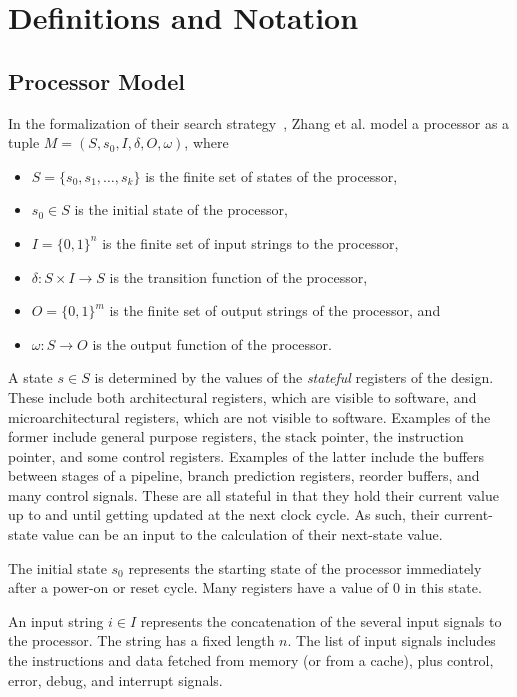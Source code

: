 \section{Definitions and Notation}
\subsection{Processor Model}
\label{sec:procmodel}
In the formalization of their search strategy~\cite{fmspaper}, Zhang et
al. model a processor as a tuple $M = (S, s_0, I, \delta, O, \omega)$, where
\begin{itemize}
  \item $S = \{s_0, s_1, \ldots, s_k\}$ is the finite set of states of the
    processor,
  \item $s_0 \in S$ is the initial state of the processor,
  \item $I = \{0,1\}^n$ is the finite set of input strings to the processor,
  \item $\delta: S \times I \rightarrow S$ is the transition function of the processor,
  \item $O = \{0,1\}^m$ is the finite set of output strings of the processor,
    and
  \item $\omega: S \rightarrow O$ is the output function of the processor.
\end{itemize}

A state $s \in S$ is determined by the values of the \emph{stateful} registers
of the design. These include both architectural registers, which are visible to
software, and microarchitectural registers, which are not visible to
software. Examples of the former include general purpose registers, the stack
pointer, the instruction pointer, and some control registers. Examples of the
latter include the buffers between stages of a pipeline, branch prediction
registers, reorder buffers, and many control signals. These are all stateful in that
they hold their current value up to and until getting updated at the next clock
cycle. As such, their current-state value can be an input to the calculation of their
next-state value. 

The initial state $s_0$ represents the starting state of the processor
immediately after a
power-on or reset cycle. Many registers have a value of 0 in this state.

An input string $i \in I$ represents the concatenation of the several input
signals to the processor. The string has a fixed length $n$. The list of input
signals includes the instructions and data fetched from memory (or from a
cache), plus control, error, debug, and interrupt signals.

